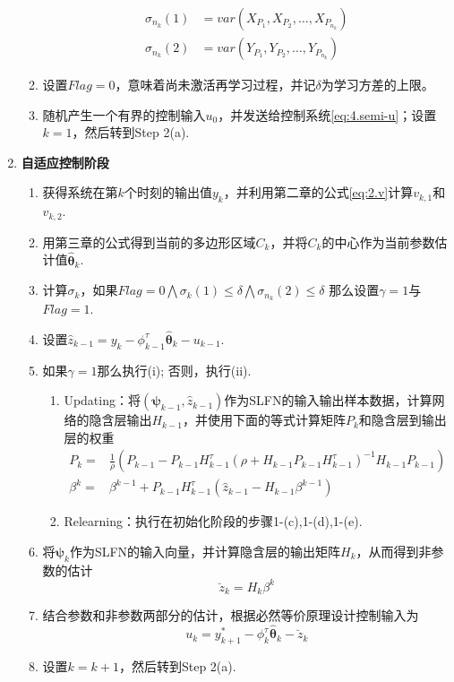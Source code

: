 \begin{enumerate}
\begin{enumerate}
\begin{equation}
\begin{split}%
\sigma_{n_{k}}(1) &= var(X_{P_{1}},X_{P_{2}},\ldots,X_{P_{n_{k}}}) \\
\sigma_{n_{k}}(2) &= var(Y_{P_{1}},Y_{P_{2}},\ldots,Y_{P_{n_{k}}})
\end{split}
\end{equation}
\item 设置$Flag=0$，意味着尚未激活再学习过程，并记$\delta$为学习方差的上限。
\item 随机产生一个有界的控制输入$u_{0}$，并发送给控制系统\eqref{eq:4.semi-u}；设置$k=1$，然后转到Step 2(a).
\end{enumerate}
\item \textbf{自适应控制阶段}
\begin{enumerate}%
\item 获得系统在第$k$个时刻的输出值$y_{k}$，并利用第二章的公式\eqref{eq:2.v}计算$v_{k,1}$和$v_{k,2}$.
\item 用第三章的公式得到当前的多边形区域$C_{k}$，并将$C_{k}$的中心作为当前参数估计值$\hat{\bm{\theta}}_{k}$.
\item 计算$\sigma_{k}$，如果$Flag=0\bigwedge\sigma_{k}(1)\leq\delta\bigwedge\sigma_{n_{k}}(2)\leq\delta$ 那么设置$\gamma=1$与$Flag=1$.
\item 设置$\hat{z}_{k-1}=y_{k}-\phi_{k-1}^{\tau}\hat{\bm{\theta}}_{k}-u_{k-1}$.
\item 如果$\gamma=1$那么执行(i); 否则，执行(ii).
\begin{enumerate}%
\item Updating：将$(\bm{\psi}_{k-1},\hat{z}_{k-1})$作为SLFN的输入输出样本数据，计算网络的隐含层输出$H_{k-1}$，并使用下面的等式计算矩阵$P_{k}$和隐含层到输出层的权重
\begin{equation}\label{eq.elmk}
\begin{split}%
P_{k}=&\frac{1}{\rho}(P_{k-1}-P_{k-1}H_{k-1}^{\tau}(\rho+H_{k-1}P_{k-1}H_{k-1}^{\tau})^{-1}H_{k-1}P_{k-1})\\
\beta^{k}=&\beta^{k-1} + P_{k-1}H_{k-1}^{\tau}(\hat{z}_{k-1}-H_{k-1}\beta^{k-1})
\end{split}
\end{equation}
\item Relearning：执行在初始化阶段的步骤1-(c),1-(d),1-(e).
\end{enumerate}
\item 将$\bm{\psi}_{k}$作为SLFN的输入向量，并计算隐含层的输出矩阵$H_{k}$，从而得到非参数的估计
\begin{equation}\label{eq.hat.z.k}
\breve{z}_{k}=H_{k}\beta^{k}
\end{equation}
\item 结合参数和非参数两部分的估计，根据必然等价原理设计控制输入为
\begin{equation}\label{eq.4:u}
u_{k}=y^{*}_{k+1}-\phi_{k}^{\tau}\hat{\bm{\theta}}_{k}-\breve{z}_{k}
\end{equation}
\item 设置$k=k+1$，然后转到Step 2(a).
\end{enumerate}
\end{enumerate}

